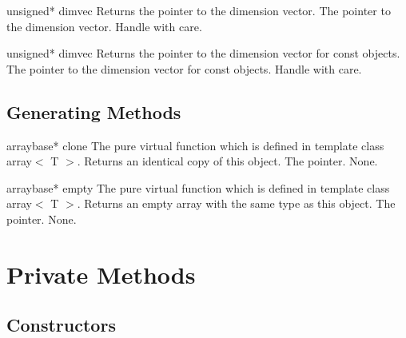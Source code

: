 \clearpage

\setNormalInstance
\printEmptyMethodReturnSpecial
{unsigned*}
{dimvec}
{Returns the pointer to the dimension vector.}
{The pointer to the dimension vector.}
{Handle with care.}

\setConstInstance
\printEmptyMethodReturnSpecial
{unsigned*}
{dimvec}
{Returns the pointer to the dimension vector for const objects.}
{The pointer to the dimension vector for const objects.}
{Handle with care.}

\vspace*{10mm}

\subsection{Generating Methods}

\setConstInstance
\printEmptyMethodReturnSpecial
{arraybase*}
{clone}
{The pure virtual function which is defined in template class array$<$
T $>$. Returns an identical copy of this object.}
{The pointer.}
{None.}

\setConstInstance
\printEmptyMethodReturnSpecial
{arraybase*}
{empty}
{The pure virtual function which is defined in template class array$<$
T $>$. Returns an empty array with the same type as this object.}
{The pointer.}
{None.}

\clearpage

\section{Private Methods}

\subsection{Constructors}

